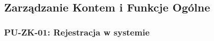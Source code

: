 \documentclass[a4paper,12pt]{article}
\begin{document}
\subsection{Zarządzanie Kontem i Funkcje Ogólne}


\subsubsection{PU-ZK-01: Rejestracja w systemie}

\begingroup %
\small %
\renewcommand{\arraystretch}{1.2} %

\newlength{\pierwszakolumnaszerokoscPUZKDetailShort} %
\setlength{\pierwszakolumnaszerokoscPUZKDetailShort}{4.0cm} %

\newlength{\drugakolumnaszerokoscPUZKDetailShort} %
\setlength{\drugakolumnaszerokoscPUZKDetailShort}{\dimexpr\textwidth-\pierwszakolumnaszerokoscPUZKDetailShort-2\tabcolsep-3\arrayrulewidth\relax}
\end{document}
